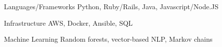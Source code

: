 

\begin{cvskills}
  \cvskill
    {Languages/Frameworks}
    {Python, Ruby/Rails, Java, Javascript/Node.JS}

  \cvskill
    {Infrastructure}
    {AWS, Docker, Ansible, SQL}

  \cvskill
    {Machine Learning}
    {Random forests, vector-based NLP, Markov chains}

\end{cvskills}
